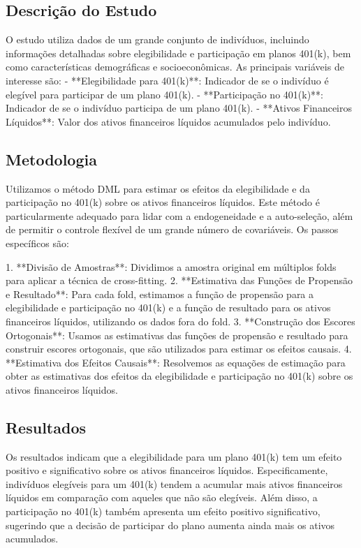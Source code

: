 \documentclass[a4paper,12pt]{article}[abntex2]
\begin{document}
\subsection*{Descrição do Estudo}

O estudo utiliza dados de um grande conjunto de indivíduos, incluindo informações detalhadas sobre elegibilidade e participação em planos 401(k), bem como características demográficas e socioeconômicas. As principais variáveis de interesse são:
- **Elegibilidade para 401(k)**: Indicador de se o indivíduo é elegível para participar de um plano 401(k).
- **Participação no 401(k)**: Indicador de se o indivíduo participa de um plano 401(k).
- **Ativos Financeiros Líquidos**: Valor dos ativos financeiros líquidos acumulados pelo indivíduo.

\subsection*{Metodologia}

Utilizamos o método DML para estimar os efeitos da elegibilidade e da participação no 401(k) sobre os ativos financeiros líquidos. Este método é particularmente adequado para lidar com a endogeneidade e a auto-seleção, além de permitir o controle flexível de um grande número de covariáveis. Os passos específicos são:

1. **Divisão de Amostras**: Dividimos a amostra original em múltiplos folds para aplicar a técnica de cross-fitting.
2. **Estimativa das Funções de Propensão e Resultado**: Para cada fold, estimamos a função de propensão para a elegibilidade e participação no 401(k) e a função de resultado para os ativos financeiros líquidos, utilizando os dados fora do fold.
3. **Construção dos Escores Ortogonais**: Usamos as estimativas das funções de propensão e resultado para construir escores ortogonais, que são utilizados para estimar os efeitos causais.
4. **Estimativa dos Efeitos Causais**: Resolvemos as equações de estimação para obter as estimativas dos efeitos da elegibilidade e participação no 401(k) sobre os ativos financeiros líquidos.

\subsection*{Resultados}

Os resultados indicam que a elegibilidade para um plano 401(k) tem um efeito positivo e significativo sobre os ativos financeiros líquidos. Especificamente, indivíduos elegíveis para um 401(k) tendem a acumular mais ativos financeiros líquidos em comparação com aqueles que não são elegíveis. Além disso, a participação no 401(k) também apresenta um efeito positivo significativo, sugerindo que a decisão de participar do plano aumenta ainda mais os ativos acumulados.
\end{document}
